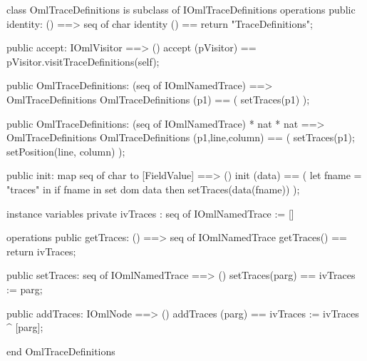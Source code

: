 \begin{vdm_al}
class OmlTraceDefinitions is subclass of IOmlTraceDefinitions
operations
  public identity: () ==> seq of char
  identity () == return "TraceDefinitions";

  public accept: IOmlVisitor ==> ()
  accept (pVisitor) == pVisitor.visitTraceDefinitions(self);

  public OmlTraceDefinitions:
    (seq of IOmlNamedTrace) ==> OmlTraceDefinitions
  OmlTraceDefinitions (p1) == 
    ( setTraces(p1) );

  public OmlTraceDefinitions:
    (seq of IOmlNamedTrace) *
    nat *
    nat ==> OmlTraceDefinitions
  OmlTraceDefinitions (p1,line,column) == 
    ( setTraces(p1);
      setPosition(line, column) );

  public init: map seq of char to [FieldValue] ==> ()
  init (data) ==
    ( let fname = "traces" in
        if fname in set dom data
        then setTraces(data(fname)) );

instance variables
  private ivTraces : seq of IOmlNamedTrace := []

operations
  public getTraces: () ==> seq of IOmlNamedTrace
  getTraces() == return ivTraces;

  public setTraces: seq of IOmlNamedTrace ==> ()
  setTraces(parg) == ivTraces := parg;

  public addTraces: IOmlNode ==> ()
  addTraces (parg) == ivTraces := ivTraces ^ [parg];

end OmlTraceDefinitions
\end{vdm_al}

